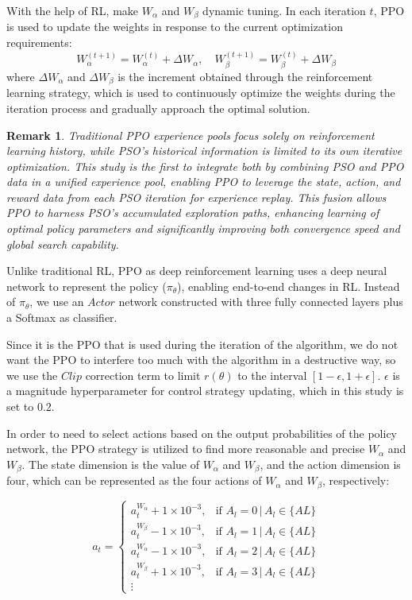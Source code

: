 \documentclass[review]{elsarticle}
\newtheorem{remark}{Remark}
\begin{document}
With the help of RL, make $W_{\alpha}$ and $W_{\beta}$ dynamic tuning. In each iteration $t$, PPO is used to update the weights in response to the current optimization requirements:
\begin{equation}
		W_{\alpha}^{(t+1)} = W_{\alpha}^{(t)} + \Delta W_{\alpha}, \quad W_{\beta}^{(t+1)} = W_{\beta}^{(t)} + \Delta W_{\beta}
\end{equation}
where $\Delta W_{\alpha}$ and $\Delta W_{\beta}$ is the increment obtained through the reinforcement learning strategy, which is used to continuously optimize the weights during the iteration process and gradually approach the optimal solution.
\begin{remark}
		\emph{Traditional PPO experience pools focus solely on reinforcement learning history, while PSO's historical information is limited to its own iterative optimization. This study is the first to integrate both by combining PSO and PPO data in a unified experience pool, enabling PPO to leverage the state, action, and reward data from each PSO iteration for experience replay. This fusion allows PPO to harness PSO's accumulated exploration paths, enhancing learning of optimal policy parameters and significantly improving both convergence speed and global search capability.}
\end{remark}

Unlike traditional RL, PPO as deep reinforcement learning uses a deep neural network to represent the policy ($\pi_{\theta}$), enabling end-to-end changes in RL. Instead of $\pi_{\theta}$, we use an $Actor$ network constructed with three fully connected layers plus a Softmax as classifier.

Since it is the PPO that is used during the iteration of the algorithm, we do not want the PPO to interfere too much with the algorithm in a destructive way, so we use the $Clip$ correction term to limit $r(\theta)$ to the interval $[1-\epsilon,1+\epsilon]$. $\epsilon$ is a magnitude hyperparameter for control strategy updating, which in this study is set to 0.2.

In order to need to select actions based on the output probabilities of the policy network, the PPO strategy is utilized to find more reasonable and precise $W_{\alpha}$ and $W_{\beta}$. The state dimension is the value of $W_{\alpha}$ and $W_{\beta}$, and the action dimension is four, which can be represented as the four actions of $W_{\alpha}$ and $W_{\beta}$, respectively:

\begin{equation}
		\label{actions}
		{a}_{t}=
		\begin{cases}
			a_t^{W_{\alpha}} + 1 \times 10^{-3}, & \text{if } A_l = 0 \,|\, A_l \in \{AL\}\\
			{a}_{t}^{W_{\beta}}-1\times10^{-3},& \text{if } A_l = 1 \,|\, A_l \in \{AL\}\\
			{a}_{t}^{W_{\alpha}}-1\times10^{-3},& \text{if } A_l = 2 \,|\, A_l \in \{AL\}\\
			{a}_{t}^{W_{\beta}}+1\times10^{-3},& \text{if } A_l = 3 \,|\, A_l \in \{AL\}\\
			\vdots & 	
		\end{cases}
\end{equation}
\end{document}
